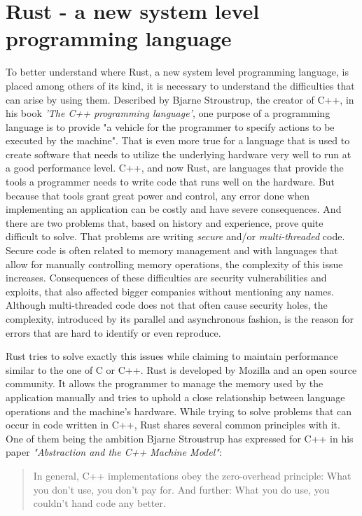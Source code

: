 \chapter{Rust - a new system level programming language}

To better understand where Rust, a new system level programming language, is placed among others of its kind, it is necessary to understand the difficulties that can arise by using them. Described by Bjarne Stroustrup, the creator of C++, in his book \textit{'The C++ programming language'}, one purpose of a programming language is to provide "a vehicle for the programmer to specify actions to be executed by the machine". That is even more true for a language that is used to create software that needs to utilize the underlying hardware very well to run at a good performance level. C++, and now Rust, are languages that provide the tools a programmer needs to write code that runs well on the hardware. But because that tools grant great power and control, any error done when implementing an application can be costly and have severe consequences. And there are two problems that, based on history and experience, prove quite difficult to solve. That problems are writing \textit{secure} and/or \textit{multi-threaded} code.
Secure code is often related to memory management and with languages that allow for manually controlling memory operations, the complexity of this issue increases. Consequences of these difficulties are security vulnerabilities and exploits, that also affected bigger companies without mentioning any names.
Although multi-threaded code does not that often cause security holes, the complexity, introduced by its parallel and asynchronous fashion, is the reason for errors that are hard to identify or even reproduce.

Rust tries to solve exactly this issues while claiming to maintain performance similar to the one of C or C++. Rust is developed by Mozilla and an open source community. It allows the programmer to manage the memory used by the application manually and tries to uphold a close relationship between language operations and the machine's hardware. While trying to solve problems that can occur in code written in C++, Rust shares several common principles with it. One of them being the ambition Bjarne Stroustrup has expressed for C++ in his paper \textit{"Abstraction and the C++ Machine Model"}:

\begin{quote}
	In general, C++ implementations obey the zero-overhead principle: What you don’t use, you don’t pay for. And further: What you do use, you couldn’t hand code any better.
\end{quote}

